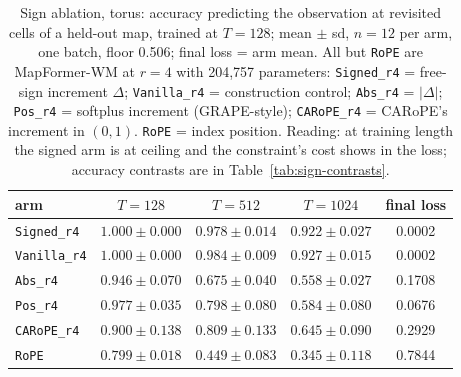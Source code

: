 \documentclass[10pt]{article}
\newcommand{\arm}[1]{\texttt{#1}}
\begin{document}
\begin{table}[t]
\centering
\small
\captionsetup{font=footnotesize,skip=4pt}
\caption{Sign ablation, torus: accuracy predicting the observation at revisited cells of a held-out map, trained at $T=128$; mean $\pm$ sd, $n=12$ per arm, one batch, floor 0.506; final loss = arm mean. All but \arm{RoPE} are MapFormer-WM at $r=4$ with 204,757 parameters: \arm{Signed\_r4} = free-sign increment $\Delta$; \arm{Vanilla\_r4} = construction control; \arm{Abs\_r4} = $|\Delta|$; \arm{Pos\_r4} = softplus increment (GRAPE-style); \arm{CARoPE\_r4} = CARoPE's increment in $(0,1)$. \arm{RoPE} = index position. Reading: at training length the signed arm is at ceiling and the constraint's cost shows in the loss; accuracy contrasts are in Table~\ref{tab:sign-contrasts}.}
\label{tab:sign}
\begin{tabular}{@{}lcccc@{}}
\toprule
arm & $T=128$ & $T=512$ & $T=1024$ & final loss \\
\midrule
\arm{Signed\_r4}  & $1.000\pm0.000$ & $0.978\pm0.014$ & $0.922\pm0.027$ & 0.0002 \\
\arm{Vanilla\_r4} & $1.000\pm0.000$ & $0.984\pm0.009$ & $0.927\pm0.015$ & 0.0002 \\
\arm{Abs\_r4}     & $0.946\pm0.070$ & $0.675\pm0.040$ & $0.558\pm0.027$ & 0.1708 \\
\arm{Pos\_r4}     & $0.977\pm0.035$ & $0.798\pm0.080$ & $0.584\pm0.080$ & 0.0676 \\
\arm{CARoPE\_r4}  & $0.900\pm0.138$ & $0.809\pm0.133$ & $0.645\pm0.090$ & 0.2929 \\
\arm{RoPE}        & $0.799\pm0.018$ & $0.449\pm0.083$ & $0.345\pm0.118$ & 0.7844 \\
\bottomrule
\end{tabular}
\end{table}
\end{document}
